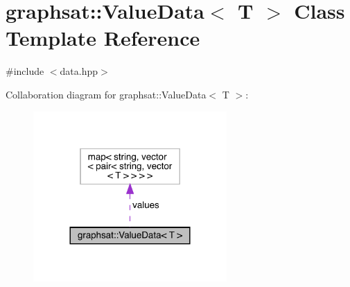 \hypertarget{classgraphsat_1_1_value_data}{}\section{graphsat\+::Value\+Data$<$ T $>$ Class Template Reference}
\label{classgraphsat_1_1_value_data}


{\ttfamily \#include $<$data.\+hpp$>$}



Collaboration diagram for graphsat\+::Value\+Data$<$ T $>$\+:
\nopagebreak
\begin{figure}[H]
\begin{center}
\leavevmode
\includegraphics[width=209pt]{classgraphsat_1_1_value_data__coll__graph}
\end{center}
\end{figure}
